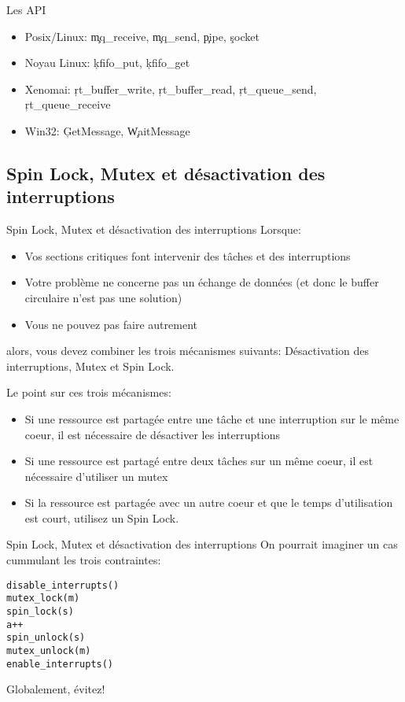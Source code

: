 \begin{frame}[fragile=singleslide]{Les API}
  \begin{itemize}
  \item Posix/Linux: \c{mq_receive}, \c{mq_send}, \c{pipe}, \c{socket}
  \item Noyau Linux: \c{kfifo_put}, \c{kfifo_get}
  \item      Xenomai:     \c{rt_buffer_write},     \c{rt_buffer_read},
    \c{rt_queue_send}, \c{rt_queue_receive}
  \item Win32: \c{GetMessage}, \c{WaitMessage}
  \end{itemize}
\end{frame}


\subsection{Spin Lock, Mutex et désactivation des interruptions}

\begin{frame}[fragile]{Spin Lock, Mutex et désactivation des interruptions}
  Lorsque:
  \begin{itemize}
  \item  Vos  sections critiques  font  intervenir  des  tâches et  des
    interruptions
  \item Votre problème ne concerne  pas un échange de données (et donc
    le buffer circulaire n'est pas une solution)
  \item Vous ne pouvez pas faire autrement
  \end{itemize}
  alors,   vous  devez   combiner  les   trois   mécanismes  suivants:
  Désactivation des interruptions, Mutex et Spin Lock.

  Le point sur ces trois mécanismes:
  \begin{itemize}
  \item  Si  une  ressource  est   partagée  entre  une  tâche  et  une
    interruption sur  le même coeur,  il est nécessaire  de désactiver
    les interruptions
  \item  Si une ressource  est partagé  entre deux  tâches sur  un même
    coeur, il est nécessaire d'utiliser un mutex
  \item Si  la ressource est  partagée avec un  autre coeur et  que le
    temps d'utilisation est court, utilisez un Spin Lock.
  \end{itemize}
\end{frame}

\begin{frame}[fragile]{Spin Lock, Mutex et désactivation des interruptions}
  On pourrait imaginer un cas cummulant les trois contraintes:
  \begin{lstlisting}
disable_interrupts()
mutex_lock(m)
spin_lock(s)
a++
spin_unlock(s)
mutex_unlock(m)
enable_interrupts()
  \end{lstlisting}
  Globalement, évitez!
\end{frame}

